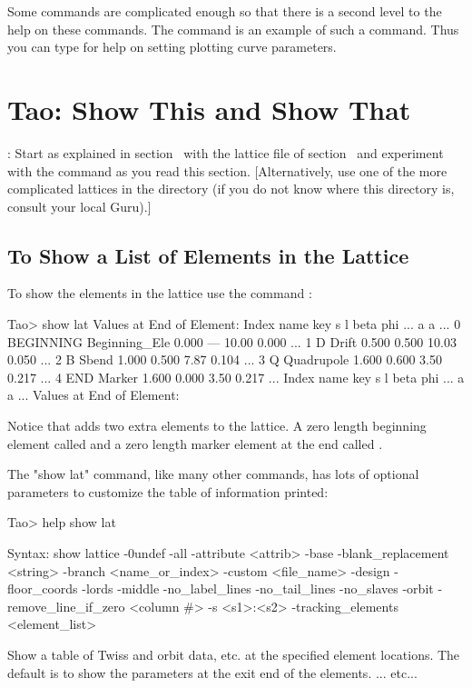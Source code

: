 \documentclass{hitec}
\newcommand{\Section}[1]{\section{#1}\vspace*{-1ex}}
\begin{document}
Some commands are complicated enough so that there is a second level to the help on these commands.
The  command is an example of such a command. Thus you can type  for
help on setting plotting curve parameters.

\Section{Tao: Show This and Show That}

: Start \tao as explained in section~ with the lattice file
 of section~ and experiment with the  command as you read
this section. [Alternatively, use one of the more complicated lattices in the
 directory (if you do not know where this directory is, consult
your local \bmad Guru).]

\subsection{To Show a List of Elements in the Lattice}

To show the elements in the lattice use the command :
{\small
\begin{code}
 Tao> show lat
      Values at End of Element:
 Index  name      key                       s       l    beta     phi ...
                                                            a       a ...
     0  BEGINNING Beginning_Ele         0.000     ---   10.00   0.000 ...
     1  D         Drift                 0.500   0.500   10.03   0.050 ...
     2  B         Sbend                 1.000   0.500    7.87   0.104 ...
     3  Q         Quadrupole            1.600   0.600    3.50   0.217 ...
     4  END       Marker                1.600   0.000    3.50   0.217 ...
 Index  name      key                       s       l    beta     phi ...
                                                            a       a ...
      Values at End of Element:
\end{code}}

Notice that \bmad adds two extra elements to the lattice. A zero length beginning element called 
and a zero length marker element at the end called .

The "show lat" command, like many other commands, has lots of optional parameters to customize the
table of information printed:

{\small
\begin{code}
Tao> help show lat

Syntax:
  show lattice {-0undef} {-all} {-attribute <attrib>} {-base}
      {-blank_replacement <string>}  {-branch <name_or_index>}
      {-custom <file_name>} {-design} {-floor_coords} {-lords} {-middle}
      {-no_label_lines} {-no_tail_lines} {-no_slaves} {-orbit} 
      {-remove_line_if_zero <column #>} {-s <s1>:<s2>} {-tracking_elements}
      {<element_list>}

Show a table of Twiss and orbit data, etc. at the specified element locations. 
The default is to show the parameters at the exit end of the elements. 
... etc...
\end{code}}
\end{document}
